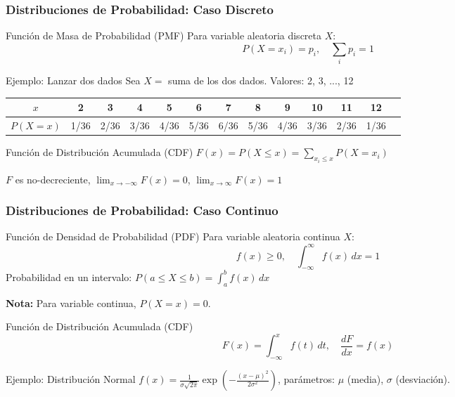 \documentclass[aspectratio=169,11pt]{beamer}
\begin{document}
\begin{frame}[fragile]
\frametitle{Distribuciones de Probabilidad: Caso Discreto}

\small

\begin{block}{Función de Masa de Probabilidad (PMF)}
Para variable aleatoria discreta $X$:
$$P(X = x_i) = p_i, \quad \sum_{i} p_i = 1$$
\end{block}

\pause
\vspace{0.2cm}
\begin{exampleblock}{Ejemplo: Lanzar dos dados}
Sea $X = $ suma de los dos dados. Valores: 2, 3, ..., 12

\begin{center}
\tiny
\begin{tabular}{c|cccccccccccc}
$x$ & 2 & 3 & 4 & 5 & 6 & 7 & 8 & 9 & 10 & 11 & 12 \\
\hline
$P(X=x)$ & 1/36 & 2/36 & 3/36 & 4/36 & 5/36 & 6/36 & 5/36 & 4/36 & 3/36 & 2/36 & 1/36 \\
\end{tabular}
\end{center}
\end{exampleblock}

\pause
\vspace{-0.1cm}
\begin{block}{Función de Distribución Acumulada (CDF)}
$F(x) = P(X \leq x) = \sum_{x_i \leq x} P(X = x_i)$

$F$ es no-decreciente, $\lim_{x \to -\infty} F(x) = 0$, $\lim_{x \to \infty} F(x) = 1$
\end{block}
\end{frame}

\begin{frame}[fragile]
\frametitle{Distribuciones de Probabilidad: Caso Continuo}

\small

\begin{block}{Función de Densidad de Probabilidad (PDF)}
Para variable aleatoria continua $X$:
$$f(x) \geq 0, \quad \int_{-\infty}^{\infty} f(x) \, dx = 1$$
Probabilidad en un intervalo: $P(a \leq X \leq b) = \int_a^b f(x) \, dx$
\end{block}

\pause
\vspace{-0.05cm}
\textbf{Nota:} Para variable continua, $P(X = x) = 0$.

\pause
\vspace{-0.05cm}
\begin{block}{Función de Distribución Acumulada (CDF)}
$$F(x) = \int_{-\infty}^{x} f(t) \, dt, \quad \frac{dF}{dx} = f(x)$$
\end{block}

\pause
\vspace{-0.05cm}
\begin{exampleblock}{Ejemplo: Distribución Normal}
$f(x) = \frac{1}{\sigma\sqrt{2\pi}} \exp\!\left(-\frac{(x-\mu)^2}{2\sigma^2}\right)$, \quad parámetros: $\mu$ (media), $\sigma$ (desviación).
\end{exampleblock}
\end{frame}
\end{document}

